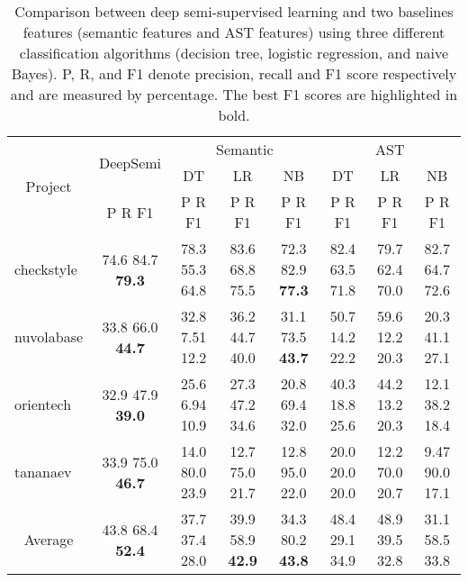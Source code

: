 \begin{table*}[t!]
	\centering
	\caption{Comparison between deep semi-supervised learning and two baselines features (semantic features and AST features) using three different classification algorithms (decision tree, logistic regression, and naive Bayes). P, R, and F1 denote precision, recall and F1 score respectively and are measured by percentage. The best F1 scores are highlighted in bold.}
	\begin{adjustbox}{width=1\textwidth}
	
	\begin{tabular}{|c|c|c|c|c|c|c|c|}
		\hline
		\multirow{3}[6]{*}{Project} & \multirow{2}[4]{*}{DeepSemi} & \multicolumn{3}{c|}{Semantic} & \multicolumn{3}{c|}{AST} \\
		\cline{3-8}          &       & DT    & LR    & NB    & DT    & LR    & NB \\
		\cline{2-8}          & P R F1 & P R F1 & P R F1 & P R F1 & P R F1 & P R F1 & P R F1 \\
		\hline
		\hline
		\multicolumn{1}{|l|}{checkstyle} & 74.6 84.7 \textbf{79.3} & 78.3 55.3 64.8 & 83.6 68.8 75.5 & 72.3 82.9 \textbf{77.3} & 82.4 63.5 71.8 & 79.7 62.4 70.0  & 82.7 64.7 72.6 \\

		\multicolumn{1}{|l|}{nuvolabase} & 33.8 66.0 \textbf{44.7} & 32.8 7.51 12.2 & 36.2 44.7 40.0 & 31.1 73.5 \textbf{43.7} & 50.7 14.2 22.2 & 59.6 12.2 20.3  & 20.3 41.1 27.1 \\
		
		\multicolumn{1}{|l|}{orientech} & 32.9 47.9 \textbf{39.0} & 25.6 6.94 10.9 & 27.3 47.2 34.6 & 20.8 69.4 32.0 & 40.3 18.8 25.6 & 44.2 13.2 20.3  & 12.1 38.2 18.4 \\
		
		\multicolumn{1}{|l|}{tananaev} & 33.9 75.0 \textbf{46.7} & 14.0 80.0 23.9 & 12.7 75.0 21.7 & 12.8 95.0 22.0 & 20.0 20.0 20.0 & 12.2 70.0 20.7  & 9.47 90.0 17.1 \\
		\hline
		\hline
		Average & 43.8 68.4 \textbf{52.4} & 37.7 37.4 28.0 & 39.9 58.9 \textbf{42.9} & 34.3 80.2 \textbf{43.8} & 48.4 29.1 34.9 & 48.9 39.5 32.8 & 31.1 58.5 33.8 \\
		\hline
	\end{tabular}%
	\end{adjustbox}
	\label{tab:within}%
\end{table*}%


